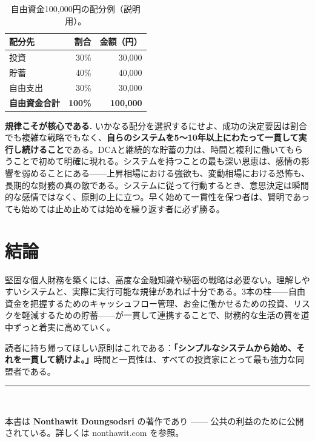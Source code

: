 \documentclass[11pt,a4paper,twocolumn]{article}
\begin{document}
\begin{table}[t]
\centering
\small
\begin{tabular}{lrr}
\toprule
\rowcolor{accent!15}
\textbf{配分先} & \textbf{割合} & \textbf{金額（円）} \\
\midrule
投資   & 30\% & 30{,}000 \\
貯蓄   & 40\% & 40{,}000 \\
自由支出 & 30\% & 30{,}000 \\
\midrule
\textbf{自由資金合計} & \textbf{100\%} & \textbf{100{,}000} \\
\bottomrule
\end{tabular}
\caption{自由資金100,000円の配分例（説明用）。}
\label{tab:alloc}
\end{table}

\textbf{規律こそが核心である.} いかなる配分を選択するにせよ、成功の決定要因は割合でも複雑な戦略でもなく、\textbf{自らのシステムを5〜10年以上にわたって一貫して実行し続けること}である。DCAと継続的な貯蓄の力は、時間と複利に働いてもらうことで初めて明確に現れる。システムを持つことの最も深い恩恵は、感情の影響を弱めることにある——上昇相場における強欲も、変動相場における恐怖も、長期的な財務の真の敵である。システムに従って行動するとき、意思決定は瞬間的な感情ではなく、原則の上に立つ。早く始めて一貫性を保つ者は、賢明であっても始めては止め止めては始めを繰り返す者に必ず勝る。

\section{結論}
堅固な個人財務を築くには、高度な金融知識や秘密の戦略は必要ない。理解しやすいシステムと、実際に実行可能な規律があれば十分である。3本の柱——自由資金を把握するためのキャッシュフロー管理、お金に働かせるための投資、リスクを軽減するための貯蓄——が一貫して連携することで、財務的な生活の質を道中ずっと着実に高めていく。

読者に持ち帰ってほしい原則はこれである：\textbf{「シンプルなシステムから始め、それを一貫して続けよ。」}時間と一貫性は、すべての投資家にとって最も強力な同盟者である。

\vspace{1em}
\noindent\rule{\linewidth}{0.4pt}\\
{\small\raggedright 本書は \textbf{Nonthawit Doungsodsri} の著作であり —— 公共の利益のために公開されている。詳しくは nonthawit.com を参照。\par}
\end{document}
